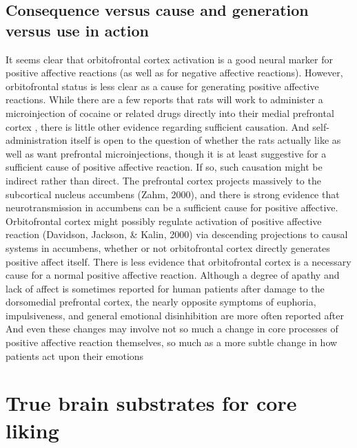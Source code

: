 \documentclass[conference]{IEEEtran}
\begin{document}
\subsection{Consequence versus cause and generation versus use in action}
It seems clear that orbitofrontal cortex activation is a
good neural marker for positive affective reactions (as
well as for negative affective reactions). However, orbitofrontal status is less clear as a cause for generating
positive affective reactions. While there are a few reports
that rats will work to administer a microinjection of
cocaine or related drugs directly into their medial prefrontal cortex , there is little other evidence regarding
sufficient causation. And self-administration itself is
open to the question of whether the rats actually like as
well as want prefrontal microinjections, though it is at
least suggestive for a sufficient cause of positive affective
reaction. If so, such causation might be indirect rather
than direct. The prefrontal cortex projects massively to
the subcortical nucleus accumbens (Zahm, 2000), and
there is strong evidence that neurotransmission in accumbens can be a sufficient cause for positive affective. Orbitofrontal cortex might possibly regulate activation of positive affective reaction (Davidson, Jackson, & Kalin, 2000) via descending projections to causal
systems in accumbens, whether or not orbitofrontal
cortex directly generates positive affect itself.
There is less evidence that orbitofrontal cortex is a
necessary cause for a normal positive affective reaction.
Although a degree of apathy and lack of affect is
sometimes reported for human patients after damage to
the dorsomedial prefrontal cortex, the nearly opposite
symptoms of euphoria, impulsiveness, and general
emotional disinhibition are more often reported after And even
these changes may involve not so much a change in core
processes of positive affective reaction themselves, so
much as a more subtle change in how patients act upon
their emotions


\section*{ True brain substrates for core liking}
\end{document}
